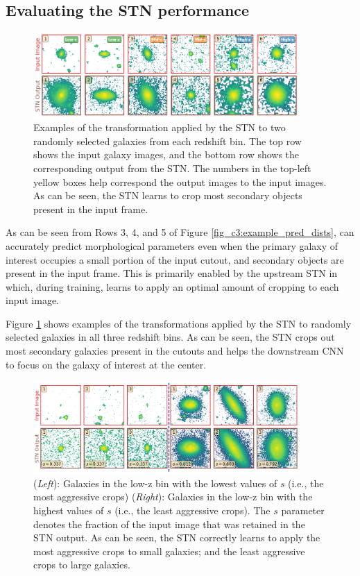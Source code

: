 \subsection{Evaluating the STN performance} \label{sec_c3:stn_performance}

\begin{figure}[htb]
    \centering
    \includegraphics[width = 0.9\textwidth]{stn_random.png}
    \caption{Examples of the transformation applied by the STN to two randomly selected galaxies from each redshift bin. The top row shows the input galaxy images, and the bottom row shows the corresponding output from the STN. The numbers in the top-left yellow boxes help correspond the output images to the input images. As can be seen, the STN learns to crop most secondary objects present in the input frame.}
    \label{fig_c3:stn_random}
\end{figure}

As can be seen from Rows 3, 4, and 5 of Figure \ref{fig_c3:example_pred_dists}, \gampen{} can accurately predict morphological parameters even when the primary galaxy of interest occupies a small portion of the input cutout, and secondary objects are present in the input frame. This is primarily enabled by the upstream STN in \gampen{} which, during training, learns to apply an optimal amount of cropping to each input image. 

Figure \ref{fig_c3:stn_random} shows examples of the transformations applied by the STN to randomly selected galaxies in all three redshift bins. As can be seen, the STN crops out most secondary galaxies present in the cutouts and helps the downstream CNN to focus on the galaxy of interest at the center.

\begin{figure}[htb]
    \centering
    \includegraphics[width = 0.9\textwidth]{stn_min_max.png}
    \caption{(\textit{Left}): Galaxies in the low-z bin  with the lowest values of $s$ (i.e., the most aggressive crops) (\textit{Right}): Galaxies in the low-z bin with the highest values of $s$ (i.e., the least aggressive crops). The $s$ parameter denotes the fraction of the input image that was retained in the STN output. As can be seen, the STN correctly learns to apply the most aggressive crops to small galaxies; and the least aggressive crops to large galaxies.}
    \label{fig_c3:stn_min_max}
\end{figure}

